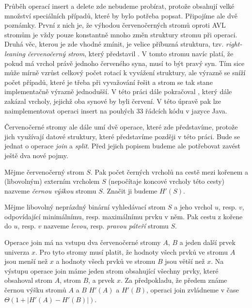 Průběh operací insert a delete zde nebudeme probírat, protože obsahují velké
množství speciálních případů, které by bylo potřeba popsat. Připojíme ale
dvě poznámky. První z nich je, že výhodou červenočerných stromů oproti AVL
stromům je vždy pouze konstantně mnoho změn struktury stromu při operaci. Druhá
věc, kterou je zde vhodné zmínit, je velice příbuzná struktura, tzv.
\emph{right-leaning červenočerný strom}, který představil \citet{rightleaning}.
V tomto stromu navíc platí, že pokud má vrchol právě jednoho červeného syna,
musí to být pravý syn. Tím sice může mírně vzrůst celkový počet rotací k
vyvážení struktury, ale výrazně se sníží počet případů, které je třeba při
vyvažování řešit a strom se tak stane implementačně výrazně jednodušší. V této
práci dále pokračoval \citet{leftleaning}, který dále zakázal vrcholy, jejichž
oba synové by byli červení. V této úpravě pak lze naimplementovat operaci
insert na pouhých 33 řádcích kódu v jazyce Java.    

Červenočerné stromy ale dále umí dvě operace, které zde představíme, protože
jich využívají datové struktury, které představíme později v této práci. Bude se jednat o operace \emph{join} a \emph{split}.
Před jejich popisem budeme ale potřebovat zavést ještě dva nové pojmy.

\begin{definice}
Mějme červenočerný strom $S$. Pak počet černých vrcholů na cestě mezi kořenem a (libovolným) externím vrcholem $S$ (nepočítaje koncové vrcholy této cesty) nazveme \emph{černou výškou} stromu $S$. Značit ji budeme $H'(S)$.
\end{definice}


\begin{definice}
Mějme libovolný neprázdný binární vyhledávací strom $S$ a jeho vrchol $u$, resp. $v$, odpovídající minimálnímu, resp. maximálnímu prvku v něm. Pak cestu z kořene do $u$, resp. $v$ nazveme \emph{levou}, resp. \emph{pravou páteří} stromu $S$.
\end{definice}

Operace join má na vstupu dva červenočerné
stromy $A$, $B$ a jeden další prvek univerza $x$. Pro tyto stromy musí platit,
že hodnoty všech prvků ve stromu $A$ jsou menší než $x$ a hodnoty všech prvků
ve stromu $B$ jsou větší než $x$. Na výstupu operace join máme jeden strom
obsahující všechny prvky, které obsahoval strom $A$, strom $B$, a prvek $x$. Za
předpokladu, že předem známe černou výšku stromů $A$
a $B$ $H'(A)$ a $H'(B)$, operaci join zvládneme v čase $\Theta(1+|H'(A) -
H'(B)|)$.

